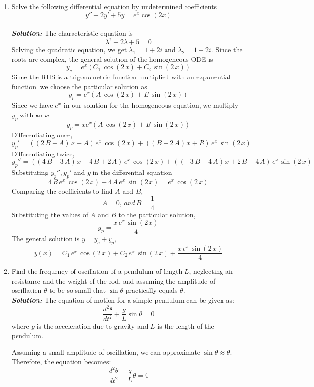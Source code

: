 \documentclass[]{book}
\theoremstyle{definition}
\begin{document}
\begin{enumerate}
\item 
Solve the following differential equation by undetermined coefficients
\[ y'' - 2y' + 5y = e^x \cos(2x) \]\\
\emph{\textbf{Solution:}}
The characteristic equation is
\[\lambda^2 - 2\lambda + 5 = 0\]
Solving the quadratic equation, we get \(\lambda_1 = 1 + 2i\) and \(\lambda_2 = 1 - 2i\).
Since the roots are complex, the general solution of the homogeneous ODE is
\[
y_c = e^{x}(C_1\,\cos(2\,x) + C_2\,\sin(2\,x))
\]
Since the RHS is a trigonometric function multiplied with an exponential function, we choose the particular solution as
\[
y_p = e^x(A\,\cos(2\,x) + B\,\sin(2\,x))
\]
Since we have $e^x$ in our solution for the homogeneous equation, we multiply $y_p$ with an $x$
\[
y_p = xe^x(A\,\cos(2\,x) + B\,\sin(2\,x))
\]
Differentiating once,
\[
y_{p}'=\left(\left(2\,B+A\right)\,x+A\right)\,{e}^{x}\,\cos\left(2\,x\right)+\left(\left(B-2\,A\right)\,x+B\right)\,{e}^{x}\,\sin\left(2\,x\right)
\]
Differentiating twice,
\[
y_{p}''=\left(\left(4\,B-3\,A\right)\,x+4\,B+2\,A\right)\,{e}^{x}\,\cos\left(2\,x\right)+\left(\left(-3\,B-4\,A\right)\,x+2\,B-4\,A\right)\,{e}^{x}\,\sin\left(2\,x\right)
\]
Substituting ${y_p}'', {y_p}'$ and ${y}$ in the differential equation
\[
4\,B\,{e}^{x}\,\cos\left(2\,x\right)-4\,A\,{e}^{x}\,\sin\left(2\,x\right)={e}^{x}\,\cos\left(2\,x\right)
\]
Comparing the coefficients to find $A$ and $B$,
\[
A = 0,\,and\,B=\frac{1}{4}
\]
Substituting the values of $A$ and $B$ to the particular solution,
\[
y_{p}=\dfrac{x\,{e}^{x}\,\sin\left(2\,x\right)}{4}
\]
The general solution is $y = y_c + y_p$,
\[
{y}(x) = C_{1}\,{e}^{x}\,\cos\left(2\,x\right)+C_{2}\,{e}^{x}\,\sin\left(2\,x\right)+\dfrac{x\,{e}^{x}\,\sin\left(2\,x\right)}{4}
\]

\item 
Find the frequency of oscillation of a pendulum of length $L$, neglecting air resistance and the weight of the rod, and assuming the amplitude of oscillation $\theta$ to be so small that $\sin \theta$ practically equals $\theta$.\\

\emph{\textbf{Solution:}}
The equation of motion for a simple pendulum can be given as:
\[ \frac{d^2\theta}{dt^2} + \frac{g}{L} \sin{\theta} = 0 \]
where $g$ is the acceleration due to gravity and $L$ is the length of the pendulum.

Assuming a small amplitude of oscillation, we can approximate $\sin \theta \approx \theta$. Therefore, the equation becomes:
\[ \frac{d^2\theta}{dt^2} + \frac{g}{L} \theta = 0 \]


\end{enumerate}
\end{document}
